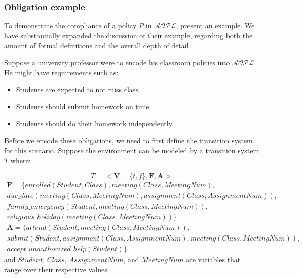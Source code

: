 
\subsubsection{Obligation example}

To demonstrate the compliance of a policy $P$ in $\mathcal{AOPL}$, \citet{gelfond_authorization_2008} present an example.
We have substantially expanded the discussion of their example, regarding both the amount of formal definitions and the overall depth of detail.

Suppose a university professor were to encode his classroom policies into $\mathcal{AOPL}$.
He might have requirements such as:

\begin{itemize}
    \item Students are expected to not miss class.
    \item Students should submit homework on time.
    \item Students should do their homework independently.
\end{itemize}

Before we encode these obligations, we need to first define the transition system for this scenario.
Suppose the environment can be modeled by a transition system $T$ where\footnotemark:

\begin{equation}
    T=<\boldsymbol{V}=\{t,f\}, \boldsymbol{F}, \boldsymbol{A}>
\end{equation}
\begin{multline}
    \boldsymbol{F} = \{enrolled(Student, Class), meeting(Class, MeetingNum), \\
        due\_date(meeting(Class, MeetingNum), assignment(Class, AssignmentNum)), \\
        family\_emergency(Student, meeting(Class, MeetingNum)), \\
        religious\_holiday(meeting(Class, MeetingNum))\}
\end{multline}
\begin{multline}
    \boldsymbol{A} = \{attend(Student, meeting(Class, MeetingNum)), \\
        submit(Student, assignment(Class, AssignmentNum), meeting(Class, MeetingNum)), \\
        accept\_unauthorized\_help(Student)\}
\end{multline}
and $Student$, $Class$, $AssignmentNum$, and $MeetingNum$ are variables that range over their respective values.

